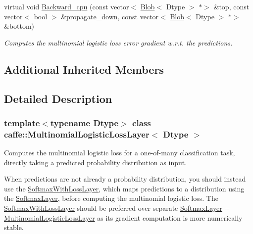 \begin{DoxyCompactItemize}
virtual void \mbox{\hyperlink{classcaffe_1_1_multinomial_logistic_loss_layer_a030ad8b4fa8b33e41b5cea44c946b4b0}{Backward\+\_\+cpu}} (const vector$<$ \mbox{\hyperlink{classcaffe_1_1_blob}{Blob}}$<$ Dtype $>$ $\ast$$>$ \&top, const vector$<$ bool $>$ \&propagate\+\_\+down, const vector$<$ \mbox{\hyperlink{classcaffe_1_1_blob}{Blob}}$<$ Dtype $>$ $\ast$$>$ \&bottom)
\begin{DoxyCompactList}\small\item\em Computes the multinomial logistic loss error gradient w.\+r.\+t. the predictions. \end{DoxyCompactList}\end{DoxyCompactItemize}
\subsection*{Additional Inherited Members}


\subsection{Detailed Description}
\subsubsection*{template$<$typename Dtype$>$\newline
class caffe\+::\+Multinomial\+Logistic\+Loss\+Layer$<$ Dtype $>$}

Computes the multinomial logistic loss for a one-\/of-\/many classification task, directly taking a predicted probability distribution as input. 

When predictions are not already a probability distribution, you should instead use the \mbox{\hyperlink{classcaffe_1_1_softmax_with_loss_layer}{Softmax\+With\+Loss\+Layer}}, which maps predictions to a distribution using the \mbox{\hyperlink{classcaffe_1_1_softmax_layer}{Softmax\+Layer}}, before computing the multinomial logistic loss. The \mbox{\hyperlink{classcaffe_1_1_softmax_with_loss_layer}{Softmax\+With\+Loss\+Layer}} should be preferred over separate \mbox{\hyperlink{classcaffe_1_1_softmax_layer}{Softmax\+Layer}} + \mbox{\hyperlink{classcaffe_1_1_multinomial_logistic_loss_layer}{Multinomial\+Logistic\+Loss\+Layer}} as its gradient computation is more numerically stable.


